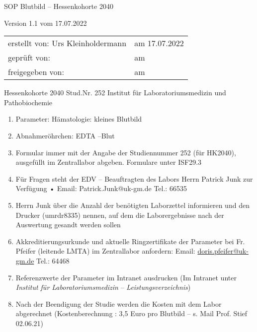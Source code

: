 \begin{center}
  {\Huge SOP Blutbild -- Hessenkohorte 2040}
  
  Version 1.1 vom 17.07.2022 
\end{center}

\vspace*{1cm}

\begin{tabular}{@{}p{}l}
  erstellt von: Urs Kleinholdermann & am 17.07.2022 \\
  geprüft von: & am \\
  freigegeben von: & am \\
\end{tabular}

\vspace*{2cm}

\begin{center}
  {\huge Hessenkohorte 2040 Stud.Nr. 252 Institut für
    Laboratoriumsmedizin und Pathobiochemie}
\end{center}


\begin{enumerate}
  \item Parameter: Hämatologie: kleines Blutbild
  \item Abnahmeröhrchen: EDTA –Blut
  \item Formular immer mit der Angabe der Studiennummer 252 (für
    HK2040), ausgefüllt im Zentrallabor abgeben. Formulare unter
    ISF29.3
  \item Für Fragen steht der EDV – Beauftragten des Labors Herrn
    Patrick Junk zur Verfügung • Email: Patrick.Junk@uk-gm.de Tel.:
    66535
  \item Herrn Junk über die Anzahl der benötigten Laborzettel
    informieren und den Drucker (umrdr8335) nennen, auf dem die
    Laborergebnisse nach der Auswertung gesandt werden sollen
  \item Akkreditierungsurkunde und aktuelle Ringzertifikate der
    Parameter bei Fr. Pfeifer (leitende LMTA) im Zentrallabor
    anfordern: Email: \url{doris.pfeifer@uk-gm.de} Tel.: 64468
  \item Referenzwerte der Parameter im Intranet ausdrucken (Im
    Intranet unter \emph{Institut für Laboratoriumsmedizin} --
    \emph{Leistungsverzeichnis})
  \item Nach der Beendigung der Studie werden die Kosten mit dem Labor
    abgerechnet (Kostenberechnung : 3,5 Euro pro Blutbild – s. Mail
    Prof. Stief 02.06.21)
\end{enumerate}
